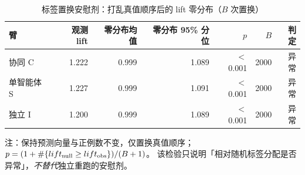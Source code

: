 \begin{table}[t]
\centering
\caption{标签置换安慰剂：打乱真值顺序后的 lift 零分布（$B$ 次置换）}
\label{tab:placebo}
\footnotesize
\setlength{\tabcolsep}{3pt}
\begin{tabular}{lrrrrrr}
\toprule
臂 & 观测 lift & 零分布均值 & 零分布 95\% 分位 & $p$ & $B$ & 判定 \\
\midrule
协同 C & 1.222 & 0.999 & 1.089 & $<$0.001 & 2000 & 异常 \\
单智能体 S & 1.227 & 0.999 & 1.091 & $<$0.001 & 2000 & 异常 \\
独立 I & 1.200 & 0.999 & 1.089 & $<$0.001 & 2000 & 异常 \\
\bottomrule
\end{tabular}
\par\smallskip
\raggedright\scriptsize
注：保持预测向量与正例数不变，仅置换真值顺序；$p=(1+\#\{lift_{\rm null}\ge lift_{\rm obs}\})/(B+1)$。
该检验只说明「相对随机标签分配是否异常」，\emph{不替代}独立重跑的安慰剂。
\end{table}
